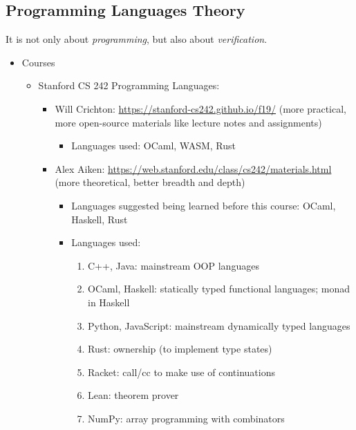 \documentclass{article}
\begin{document}
\subsection{Programming Languages Theory}
It is not only about \emph{programming}, but also about \emph{verification}.
\begin{itemize}
    \item Courses
        \begin{itemize}
            \item Stanford CS 242 Programming Languages:
            \begin{itemize}
                \item Will Crichton:
                \href{https://stanford-cs242.github.io/f19/}{https://stanford-cs242.github.io/f19/} (more practical, more open-source materials like lecture notes and assignments)
                    \begin{itemize}
                        \item Languages used:
                        OCaml, WASM, Rust
                    \end{itemize}
                \item Alex Aiken:
                \href{https://web.stanford.edu/class/cs242/materials.html}{https://web.stanford.edu/class/cs242/materials.html} (more theoretical, better breadth and depth)
                    \begin{itemize}
                        \item Languages suggested being learned before this course:
                        OCaml, Haskell, Rust
                        \item Languages used:
                        \begin{enumerate}
                            \item C++, Java: mainstream OOP languages
                            \item OCaml, Haskell: statically typed functional languages; monad in Haskell
                            \item Python, JavaScript: mainstream dynamically typed languages
                            \item Rust: ownership (to implement type states)
                            \item Racket: call/cc to make use of continuations
                            \item Lean: theorem prover
                            \item NumPy: array programming with combinators

\end{enumerate}
\end{itemize}
\end{itemize}
\end{itemize}
\end{itemize}
\end{document}
